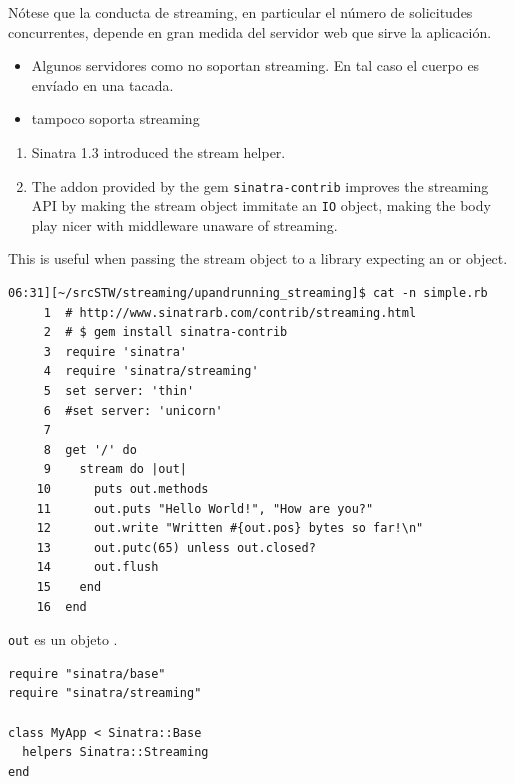 Nótese que la conducta de streaming, en particular
el número de solicitudes concurrentes, 
depende en gran medida del servidor web
que sirve la aplicación.

\begin{itemize}
\item
Algunos servidores como \webrick{} no soportan streaming. En tal caso el cuerpo es 
envíado en una tacada.
\item
\shotgun{} tampoco soporta streaming
\end{itemize}

\begin{enumerate}
\item 
Sinatra 1.3 introduced the stream helper. 
\item 
The addon provided by the gem
\verb|sinatra-contrib| improves the
streaming API by making the stream object immitate an \verb|IO| object,
making the body play nicer
with middleware unaware of streaming.
\end{enumerate}

This is useful when passing the stream object to a library expecting an \IO{} or \StringIO{} object.

\begin{verbatim}
06:31][~/srcSTW/streaming/upandrunning_streaming]$ cat -n simple.rb 
     1  # http://www.sinatrarb.com/contrib/streaming.html
     2  # $ gem install sinatra-contrib
     3  require 'sinatra'
     4  require 'sinatra/streaming'
     5  set server: 'thin'
     6  #set server: 'unicorn'
     7  
     8  get '/' do
     9    stream do |out|
    10      puts out.methods
    11      out.puts "Hello World!", "How are you?"
    12      out.write "Written #{out.pos} bytes so far!\n"
    13      out.putc(65) unless out.closed?
    14      out.flush
    15    end
    16  end
\end{verbatim}
\verb|out| es un objeto 
.


\begin{verbatim}
require "sinatra/base"
require "sinatra/streaming"

class MyApp < Sinatra::Base
  helpers Sinatra::Streaming
end
\end{verbatim}


